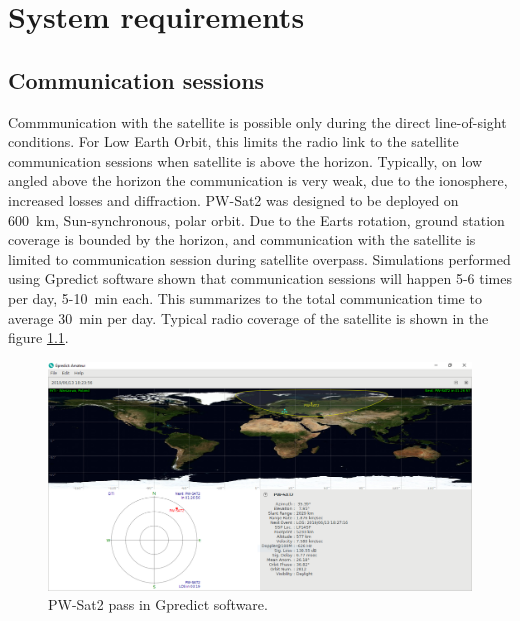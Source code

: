 \chapter{System requirements}
\section{Communication sessions}
Commmunication with the satellite is possible only during the direct line-of-sight conditions. For Low Earth Orbit, this limits the radio link to the satellite communication sessions when satellite is above the horizon. Typically, on low angled above the horizon the communication is very weak, due to the ionosphere, increased losses and diffraction.
PW-Sat2 was designed to be deployed on \SI{600}{\kilo\meter}, Sun-synchronous, polar orbit. Due to the Earts rotation, ground station coverage is bounded by the horizon, and communication with the satellite is limited to communication session during satellite overpass. Simulations performed using Gpredict software \cite{gpredict_website} shown that communication sessions will happen \si{5}-\si{6} times per day, \si{5}-\SI{10}{\minute} each. This summarizes to the total communication time to average \SI{30}{\minute} per day. Typical radio coverage of the satellite is shown in the figure \ref{gpredict_pass}.

\begin{figure}[h]
    \centering
    \includegraphics[width=0.8\paperwidth]{img/5/gpredict_pass.png}
    \caption{PW-Sat2 pass in Gpredict software.}
    \label{gpredict_pass}
\end{figure}


